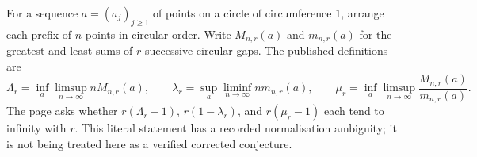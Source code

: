 For a sequence $a=(a_j)_{j\geq1}$ of points on a circle of circumference $1$, arrange each prefix of $n$ points in circular order. Write $M_{n,r}(a)$ and $m_{n,r}(a)$ for the greatest and least sums of $r$ successive circular gaps. The published definitions are
\[\Lambda_r=\inf_a\limsup_{n\to\infty}nM_{n,r}(a),\qquad
\lambda_r=\sup_a\liminf_{n\to\infty}nm_{n,r}(a),\qquad
\mu_r=\inf_a\limsup_{n\to\infty}\frac{M_{n,r}(a)}{m_{n,r}(a)}.\]
The page asks whether $r(\Lambda_r-1)$, $r(1-\lambda_r)$, and $r(\mu_r-1)$ each tend to infinity with $r$. This literal statement has a recorded normalisation ambiguity; it is not being treated here as a verified corrected conjecture.
